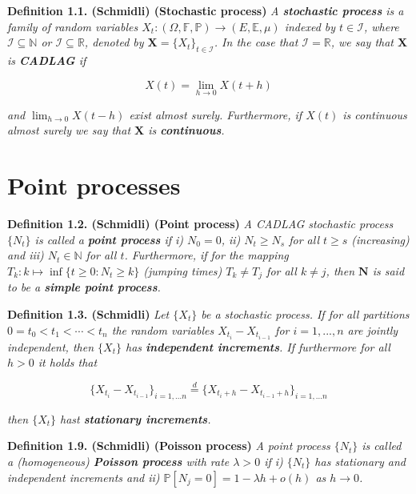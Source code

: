 \documentclass[a4paper,12pt,openany]{book}
\begin{document}
\textbf{Definition 1.1. (Schmidli) (Stochastic process)} \emph{A \textbf{stochastic process} is a family of random variables \(X_t : (\Omega,\mathbb F,\mathbb P) \to (E,\mathbb E,\mu)\) indexed by \(t\in \mathcal I\), where \(\mathcal I\subseteq \mathbb N\) or \(\mathcal I\subseteq \mathbb R\), denoted by \(\mathbf X=\{X_t\}_{t\in \mathcal I}\). In the case that \(\mathcal I=\mathbb R\), we say that \(\mathbf X\) is \textbf{CADLAG} if}

\[
X(t)=\lim_{h\to 0}X(t+h)
\]

\emph{and \(\lim_{h\to 0}X(t-h)\) exist almost surely. Furthermore, if \(X(t)\) is continuous almost surely we say that \(\mathbf X\) is \textbf{continuous}.}

\hypertarget{point-processes}{%
\section{Point processes}\label{point-processes}}

\textbf{Definition 1.2. (Schmidli) (Point process)} \emph{A CADLAG stochastic process \(\{N_t\}\) is called a \textbf{point process} if i) \(N_0=0\), ii) \(N_t\ge N_s\) for all \(t\ge s\) (increasing) and iii) \(N_t\in \mathbb N\) for all \(t\). Furthermore, if for the mapping \(T_k : k\mapsto\inf\{t\ge 0 : N_t\ge k\}\) (jumping times) \(T_k\ne T_j\) for all \(k\ne j\), then \(\mathbf N\) is said to be a \textbf{simple point process}.}

\textbf{Definition 1.3. (Schmidli)} \emph{Let \(\{X_t\}\) be a stochastic process. If for all partitions \(0=t_0<t_1<\cdots<t_n\) the random variables \(X_{t_i}-X_{t_{i-1}}\) for \(i=1,...,n\) are jointly independent, then \(\{X_t\}\) has \textbf{independent increments}. If furthermore for all \(h>0\) it holds that}

\[
\{X_{t_i}-X_{t_{i-1}}\}_{i=1,...n}\stackrel{d}{=}\{X_{t_i+h}-X_{t_{i-1}+h}\}_{i=1,...n}
\]

\emph{then \(\{X_t\}\) hast \textbf{stationary increments}.}

\textbf{Definition 1.9. (Schmidli) (Poisson process)} \emph{A point process \(\{N_t\}\) is called a (homogeneous) \textbf{Poisson process} with rate \(\lambda >0\) if i) \(\{N_t\}\) has stationary and independent increments and ii) \(\mathbb P[N_j=0]=1-\lambda h+o(h)\) as \(h\to 0\).}
\end{document}
